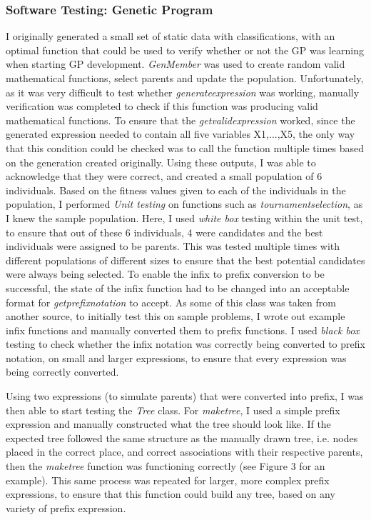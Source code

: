 \documentclass[11pt]{article}
\begin{document}
\subsubsection{Software Testing: Genetic Program}\label{subsubsec:STGP}
I originally generated a small set of static data with classifications, with an optimal function that could be used to verify whether or not the GP was learning when starting GP development.
\textit{GenMember} was used to create random valid mathematical functions, select parents and update the population. Unfortunately, as it was very difficult to test whether \textit{generate\textunderscore expression} was working, manually verification was completed to check if this function was producing valid mathematical functions. To ensure that the \textit{get\textunderscore valid\textunderscore expression} worked, since the generated expression needed to contain all five variables X1,...,X5, the only way that this condition could be checked was to call the function multiple times based on the generation created originally. Using these outputs, I was able to acknowledge that they were correct, and created a small population of 6 individuals. Based on the fitness values given to each of the individuals in the population, I performed \textit{Unit testing} on functions such as \textit{tournament\textunderscore selection}, as I knew the sample population. Here, I used \textit{white box} testing within the unit test, to ensure that out of these 6 individuals, 4 were candidates and the best individuals were assigned to be parents. This was tested multiple times with different populations of different sizes to ensure that the best potential candidates were always being selected. 
To enable the infix to prefix conversion to be successful, the state of the infix function had to be changed into an acceptable format for \textit{get\textunderscore prefix\textunderscore notation} to accept. As some of this class was taken from another source, to initially test this on sample problems, I wrote out example infix functions and manually converted them to prefix functions. I used \textit{black box} testing to check whether the infix notation was correctly being converted to prefix notation, on small and larger expressions, to ensure that every expression was being correctly converted. 

Using two expressions (to simulate parents) that were converted into prefix, I was then able to start testing the \textit{Tree} class. For \textit{make\textunderscore tree}, I used a simple prefix expression
and manually constructed what the tree should look like. If the expected tree followed the same structure as the manually drawn tree, i.e. nodes placed in the correct place, and correct associations with their respective parents, then the \textit{make\textunderscore tree} function was functioning correctly (see Figure 3 for an example).  This same process was repeated for larger, more complex prefix expressions, to ensure that this function could build any tree, based on any variety of prefix expression.  
\end{document}
